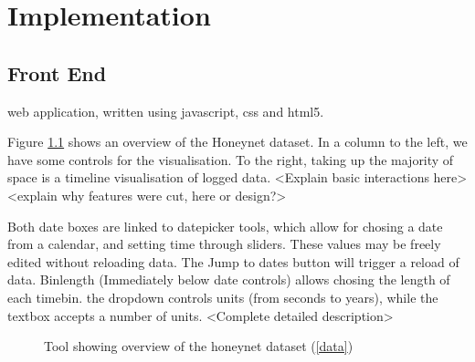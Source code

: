 \chapter{Implementation}\label{C:impl}

\section{Front End}  %

web application, written using javascript, css and html5.

Figure \ref{overview} shows an overview of the Honeynet dataset. In a column to the left, we have some controls for the visualisation. To the right, taking up the majority of space is a timeline visualisation of logged data.  
<Explain basic interactions here>
<explain why features were cut, here or design?>

Both date boxes are linked to datepicker tools, which allow for chosing a date from a calendar, and setting time through sliders. These values may be freely edited without reloading data. The Jump to dates button will trigger a reload of data. 
Binlength (Immediately below date controls) allows chosing the length of each timebin. the dropdown controls units (from seconds to years), while the textbox accepts a number of units.
<Complete detailed description>
\begin{figure}[h!]
\caption{\protect\label{overview}Tool showing overview of the honeynet dataset (\ref{data})}
\end{figure}


